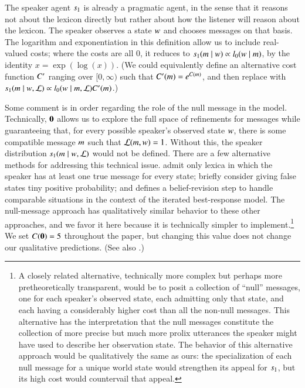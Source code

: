 \documentclass[leqno,12pt]{article}
\begin{document}

The speaker agent $s_{1}$ is already a pragmatic agent, in the
sense that it reasons not about the lexicon directly but rather about
how the listener will reason about the lexicon. The speaker observes a
state $w$ and chooses messages on that basis. The logarithm and
exponentiation in this definition allow us to include real-valued
costs; where the costs are all $0$, it reduces to
$s_{1}(m \mid w) \propto l_{0}(w \mid
m)$,
by the identity $x = \exp(\log(x))$. (We could equivalently define an
alternative cost function $C'$ ranging over $[0,\infty)$ such
that $C'(m)=e^{C(m)}$, and then replace
 with
$s_{1}(m \mid w, \mathcal{L}) \propto l_{0}(w
\mid m,\mathcal{L}) C'(m)$.)

    

Some comment is in order regarding the role of the null message in the
model.  Technically, $\mathbf{0}$ allows us to explore the full space of
refinements for messages while guaranteeing that, for every possible
speaker's observed state $w$, there is some compatible message
$m$ such that $\mathcal{L}(m, w) = 1$.  Without this, the speaker
distribution $s_{1}(m \mid w, \mathcal{L})$ would not be
defined.  There are a few alternative methods for addressing this
technical issue. \citet{Bergen:Goodman:Levy:2012} admit only lexica in
which the speaker has at least one true message for every state;
\citet{Bergen:Levy:Goodman:2014} briefly consider giving false states
tiny positive probability; and \citet{Jaeger:2011} defines a
belief-revision step to handle comparable situations in the context of
the iterated best-response model. The null-message approach has
qualitatively similar behavior to these other approaches, and we favor
it here because it is technically simpler to implement.\footnote{A
  closely related alternative, technically more complex but perhaps
  more pretheoretically transparent, would be to posit a collection of
  ``null'' messages, one for each speaker's observed state, each
  admitting only that state, and each having a considerably higher
  cost than all the non-null messages. This alternative has the
  interpretation that the null messages constitute the collection of
  more precise but much more prolix utterances the speaker might have
  used to describe her observation state.  The behavior of this
  alternative approach would be qualitatively the same as ours: the
  specialization of each null message for a unique world state would
  strengthen its appeal for $s_{1}$, but its high cost would
  countervail that appeal.}  We set $C(\mathbf{0}) = 5$ throughout
the paper, but changing this value does not change our qualitative
predictions.  (See also .)
\end{document}
